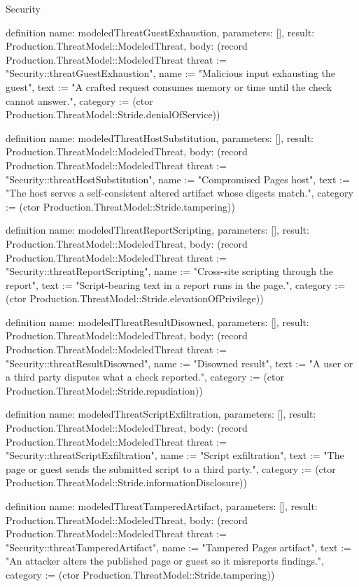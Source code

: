 \begin{lexlean}{Security}
\begin{semanticmodule}
definition{
  name: modeledThreatGuestExhaustion,
  parameters: [],
  result: Production.ThreatModel::ModeledThreat,
  body: (record Production.ThreatModel::ModeledThreat {threat := "Security::threatGuestExhaustion", name := "Malicious input exhausting the guest", text := "A crafted request consumes memory or time until the check cannot answer.", category := (ctor Production.ThreatModel::Stride.denialOfService)})
}

definition{
  name: modeledThreatHostSubstitution,
  parameters: [],
  result: Production.ThreatModel::ModeledThreat,
  body: (record Production.ThreatModel::ModeledThreat {threat := "Security::threatHostSubstitution", name := "Compromised Pages host", text := "The host serves a self-consistent altered artifact whose digests match.", category := (ctor Production.ThreatModel::Stride.tampering)})
}

definition{
  name: modeledThreatReportScripting,
  parameters: [],
  result: Production.ThreatModel::ModeledThreat,
  body: (record Production.ThreatModel::ModeledThreat {threat := "Security::threatReportScripting", name := "Cross-site scripting through the report", text := "Script-bearing text in a report runs in the page.", category := (ctor Production.ThreatModel::Stride.elevationOfPrivilege)})
}

definition{
  name: modeledThreatResultDisowned,
  parameters: [],
  result: Production.ThreatModel::ModeledThreat,
  body: (record Production.ThreatModel::ModeledThreat {threat := "Security::threatResultDisowned", name := "Disowned result", text := "A user or a third party disputes what a check reported.", category := (ctor Production.ThreatModel::Stride.repudiation)})
}

definition{
  name: modeledThreatScriptExfiltration,
  parameters: [],
  result: Production.ThreatModel::ModeledThreat,
  body: (record Production.ThreatModel::ModeledThreat {threat := "Security::threatScriptExfiltration", name := "Script exfiltration", text := "The page or guest sends the submitted script to a third party.", category := (ctor Production.ThreatModel::Stride.informationDisclosure)})
}

definition{
  name: modeledThreatTamperedArtifact,
  parameters: [],
  result: Production.ThreatModel::ModeledThreat,
  body: (record Production.ThreatModel::ModeledThreat {threat := "Security::threatTamperedArtifact", name := "Tampered Pages artifact", text := "An attacker alters the published page or guest so it misreports findings.", category := (ctor Production.ThreatModel::Stride.tampering)})
}


\end{semanticmodule}
\end{lexlean}
